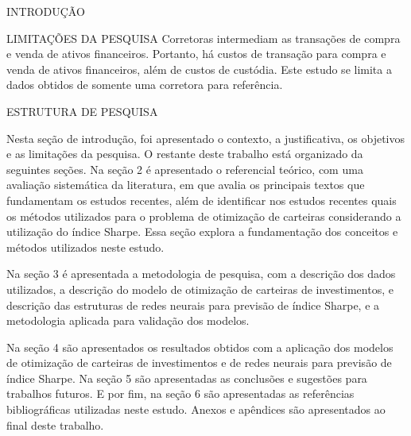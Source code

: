 \begin{section}{INTRODUÇÃO}
\begin{subsection}{LIMITAÇÕES DA PESQUISA}
        \ipar Corretoras intermediam as transações de compra e venda de ativos financeiros. Portanto, há custos de transação para compra e venda de ativos financeiros, além de custos de custódia. Este estudo se limita a dados obtidos de somente uma corretora para referência.

    \end{subsection}

    \begin{subsection}{ESTRUTURA DE PESQUISA}
    
        \ipar Nesta seção de introdução, foi apresentado o contexto, a justificativa, os objetivos e as limitações da pesquisa. O restante deste trabalho está organizado da seguintes seções. Na seção 2 é apresentado o referencial teórico, com uma avaliação sistemática da literatura, em que avalia os principais textos que fundamentam os estudos recentes, além de identificar nos estudos recentes quais os métodos utilizados para o problema de otimização de carteiras considerando a utilização do índice Sharpe. Essa seção explora a fundamentação dos conceitos e métodos utilizados neste estudo. 
        
        \ipar Na seção 3 é apresentada a metodologia de pesquisa, com a descrição dos dados utilizados, a descrição do modelo de otimização de carteiras de investimentos, e descrição das estruturas de redes neurais para previsão de índice Sharpe, e a metodologia aplicada para validação dos modelos.
        
        \ipar Na seção 4 são apresentados os resultados obtidos com a aplicação dos modelos de otimização de carteiras de investimentos e de redes neurais para previsão de índice Sharpe. Na seção 5 são apresentadas as conclusões e sugestões para trabalhos futuros. E por fim, na seção 6 são apresentadas as referências bibliográficas utilizadas neste estudo. Anexos e apêndices são apresentados ao final deste trabalho.

    \end{subsection}

\end{section}

\pagebreak